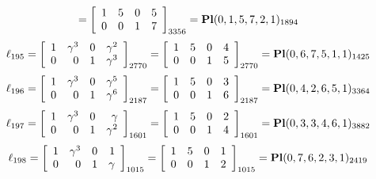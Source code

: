 \documentclass{article}
\begin{document}
{$$=
\left[
\begin{array}{*{4}c}
1  & 5  & 0  & 5\\
0  & 0  & 1  & 7\\
\end{array}
\right]_{3356}
={\rm\bf Pl}(0,1,5,7,2,1 )_{1894}$$
$$
\ell_{195} = 
\left[
\begin{array}{*{4}{r}}
1 & \gamma^{3} & 0 & \gamma^{2}\\
0 & 0 & 1 & \gamma^{3}\\
\end{array}
\right]
_{2770}
=
\left[
\begin{array}{*{4}c}
1  & 5  & 0  & 4\\
0  & 0  & 1  & 5\\
\end{array}
\right]_{2770}
={\rm\bf Pl}(0,6,7,5,1,1 )_{1425}$$
$$
\ell_{196} = 
\left[
\begin{array}{*{4}{r}}
1 & \gamma^{3} & 0 & \gamma^{5}\\
0 & 0 & 1 & \gamma^{6}\\
\end{array}
\right]
_{2187}
=
\left[
\begin{array}{*{4}c}
1  & 5  & 0  & 3\\
0  & 0  & 1  & 6\\
\end{array}
\right]_{2187}
={\rm\bf Pl}(0,4,2,6,5,1 )_{3364}$$
$$
\ell_{197} = 
\left[
\begin{array}{*{4}{r}}
1 & \gamma^{3} & 0 & \gamma \\
0 & 0 & 1 & \gamma^{2}\\
\end{array}
\right]
_{1601}
=
\left[
\begin{array}{*{4}c}
1  & 5  & 0  & 2\\
0  & 0  & 1  & 4\\
\end{array}
\right]_{1601}
={\rm\bf Pl}(0,3,3,4,6,1 )_{3882}$$
$$
\ell_{198} = 
\left[
\begin{array}{*{4}{r}}
1 & \gamma^{3} & 0 & 1\\
0 & 0 & 1 & \gamma \\
\end{array}
\right]
_{1015}
=
\left[
\begin{array}{*{4}c}
1  & 5  & 0  & 1\\
0  & 0  & 1  & 2\\
\end{array}
\right]_{1015}
={\rm\bf Pl}(0,7,6,2,3,1 )_{2419}$$
}
\end{document}
